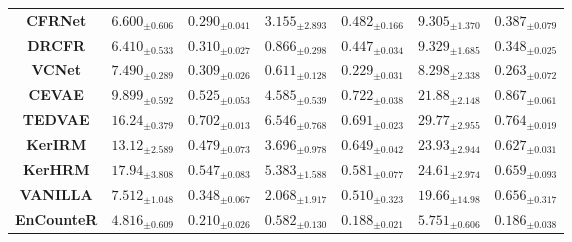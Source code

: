 \documentclass[journal]{IEEEtran}
\begin{document}
\begin{table}[t]
{\begin{center}
{\begin{tabular}{c|cc|cc|cc}
\bf CFRNet & $ 6.600_{\pm 0.606} $ & $ 0.290_{\pm 0.041} $  & $ 3.155_{\pm 2.893} $ & $ 0.482_{\pm 0.166} $  & $ 9.305_{\pm 1.370} $ & $ 0.387_{\pm 0.079} $ \\
\bf DRCFR & $ 6.410_{\pm 0.533} $ & $ 0.310_{\pm 0.027} $  & $ 0.866_{\pm 0.298} $ & $ 0.447_{\pm 0.034} $  & $ 9.329_{\pm 1.685} $ & $ 0.348_{\pm 0.025} $ \\
\bf VCNet & $ 7.490_{\pm 0.289} $ & $ 0.309_{\pm 0.026} $  & \underline{$ 0.611_{\pm 0.128} $} & \underline{$ 0.229_{\pm 0.031} $} & \underline{$ 8.298_{\pm 2.338} $} & \underline{$ 0.263_{\pm 0.072} $} \\
\bf CEVAE & $ 9.899_{\pm 0.592} $ & $ 0.525_{\pm 0.053} $  & $ 4.585_{\pm 0.539} $ & $ 0.722_{\pm 0.038} $  & $ 21.88_{\pm 2.148} $ & $ 0.867_{\pm 0.061} $ \\
\bf TEDVAE & $ 16.24_{\pm 0.379} $ & $ 0.702_{\pm 0.013} $  & $ 6.546_{\pm 0.768} $ & $ 0.691_{\pm 0.023} $  & $ 29.77_{\pm 2.955} $ & $ 0.764_{\pm 0.019} $ \\
\bf KerIRM & $ 13.12_{\pm 2.589} $ & $ 0.479_{\pm 0.073} $  & $ 3.696_{\pm 0.978} $ & $ 0.649_{\pm 0.042} $  & $ 23.93_{\pm 2.944} $ & $ 0.627_{\pm 0.031} $ \\
\bf KerHRM & $ 17.94_{\pm 3.808} $ & $ 0.547_{\pm 0.083} $  & $ 5.383_{\pm 1.588} $ & $ 0.581_{\pm 0.077} $  & $ 24.61_{\pm 2.974} $ & $ 0.659_{\pm 0.093} $ \\

\midrule 

\bf VANILLA & 
$ 7.512_{\pm 1.048} $ & $ 0.348_{\pm 0.067} $ 
& $ 2.068_{\pm 1.917} $ & $ 0.510_{\pm 0.323} $ 
& $ 19.66_{\pm 14.98} $ & $ 0.656_{\pm 0.317} $ 
\\

\bf EnCounteR  & $ \mathbf{ 4.816_{\pm 0.609} } $ & $ \mathbf{ 0.210_{\pm 0.026} } $ 
& $ \mathbf{ 0.582_{\pm 0.130} } $ & $ \mathbf{ 0.188_{\pm 0.021} } $ 
& $ \mathbf{ 5.751_{\pm 0.606} } $ & $ \mathbf{ 0.186_{\pm 0.038} } $ 
\\

\bottomrule
\end{tabular}
}
\end{center}
}
\end{table}

\label{sec:ex-linear}
\end{document}
